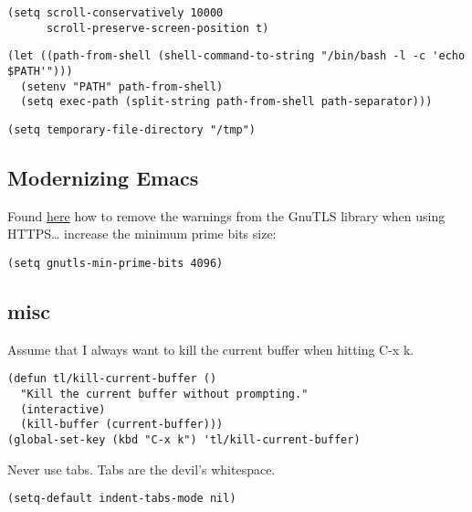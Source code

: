 \documentclass[12pt]{article}
\begin{document}
\lstset{language=Lisp,label= ,caption= ,numbers=none}
\begin{lstlisting}
(setq scroll-conservatively 10000
      scroll-preserve-screen-position t)
\end{lstlisting}


\lstset{language=Lisp,label= ,caption= ,numbers=none}
\begin{lstlisting}
(let ((path-from-shell (shell-command-to-string "/bin/bash -l -c 'echo $PATH'")))
  (setenv "PATH" path-from-shell)
  (setq exec-path (split-string path-from-shell path-separator)))
\end{lstlisting}

\lstset{language=Lisp,label= ,caption= ,numbers=none}
\begin{lstlisting}
(setq temporary-file-directory "/tmp")
\end{lstlisting}

\subsection{Modernizing Emacs}
\label{sec-1-5}

Found \href{https://github.com/wasamasa/dotemacs/blob/master/init.org#init}{here} how to remove the warnings from the GnuTLS library when
using HTTPS\ldots{} increase the minimum prime bits size:
\lstset{language=Lisp,label= ,caption= ,numbers=none}
\begin{lstlisting}
(setq gnutls-min-prime-bits 4096)
\end{lstlisting}

\subsection{misc}
\label{sec-1-6}
Assume that I always want to kill the current buffer when hitting C-x k.
\lstset{language=Lisp,label= ,caption= ,numbers=none}
\begin{lstlisting}
(defun tl/kill-current-buffer ()
  "Kill the current buffer without prompting."
  (interactive)
  (kill-buffer (current-buffer)))
(global-set-key (kbd "C-x k") 'tl/kill-current-buffer)
\end{lstlisting}



Never use tabs. Tabs are the devil’s whitespace.

\lstset{language=Lisp,label= ,caption= ,numbers=none}
\begin{lstlisting}
(setq-default indent-tabs-mode nil)
\end{lstlisting}
\end{document}
